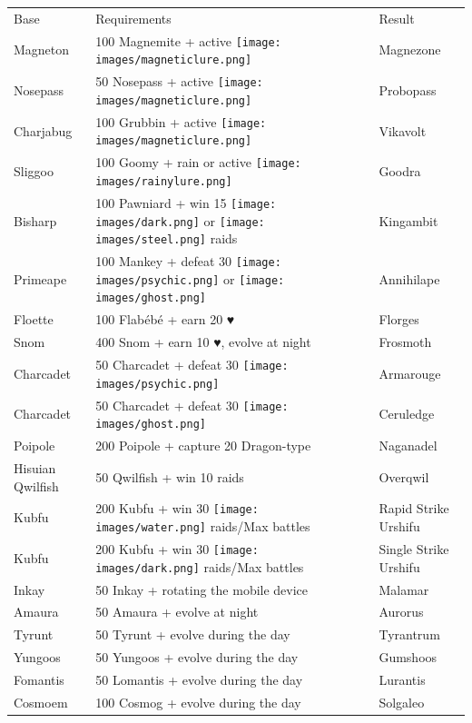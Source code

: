 \begin{table}
\footnotesize
\centering
\begin{tabular}{lll}
  Base & Requirements & Result \\
  \Midrule
  Magneton & 100 Magnemite + active \texttt{[image: images/magneticlure.png]} & Magnezone\\
  Nosepass & 50 Nosepass + active \texttt{[image: images/magneticlure.png]} & Probopass\\
  Charjabug & 100 Grubbin + active \texttt{[image: images/magneticlure.png]} & Vikavolt \\
  Sliggoo	& 100 Goomy + rain or active \texttt{[image: images/rainylure.png]}& Goodra\\
  Bisharp	& 100 Pawniard + win 15 \texttt{[image: images/dark.png]} or \texttt{[image: images/steel.png]} raids & Kingambit\\
  Primeape & 100 Mankey + defeat 30 \texttt{[image: images/psychic.png]} or \texttt{[image: images/ghost.png]} & Annihilape\\
  Floette	& 100 Flabébé + earn 20 ♥ & Florges\\
  Snom & 400 Snom + earn 10 ♥, evolve at night & Frosmoth \\
  Charcadet	& 50 Charcadet + defeat 30 \texttt{[image: images/psychic.png]}& Armarouge\\
  Charcadet	& 50 Charcadet + defeat 30 \texttt{[image: images/ghost.png]}& Ceruledge\\
  Poipole & 200 Poipole + capture 20 Dragon-type & Naganadel\\
  Hisuian Qwilfish & 50 Qwilfish + win 10 raids & Overqwil\\
  Kubfu	& 200 Kubfu + win 30 \texttt{[image: images/water.png]} raids/Max battles & Rapid Strike Urshifu\\
  Kubfu	& 200 Kubfu + win 30 \texttt{[image: images/dark.png]} raids/Max battles & Single Strike Urshifu\\
  Inkay	& 50 Inkay + rotating the mobile device & Malamar\\
  Amaura & 50 Amaura + evolve at night & Aurorus\\
  Tyrunt & 50 Tyrunt + evolve during the day & Tyrantrum\\
  Yungoos & 50 Yungoos + evolve during the day & Gumshoos\\
  Fomantis & 50 Lomantis + evolve during the day & Lurantis\\
  Cosmoem & 100 Cosmog + evolve during the day & Solgaleo\\

\end{tabular}
\end{table}
